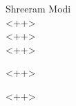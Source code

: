 \documentclass[12pt]{article}
\begin{document}
\begin{flushleft}

Shreeram Modi\\
<++>\\ %
<++>\\ %
<++>\\ %

\centerline{<++>} %

\setlength{\parindent}{0.5in}

<++>

\end{flushleft}
\end{document}
